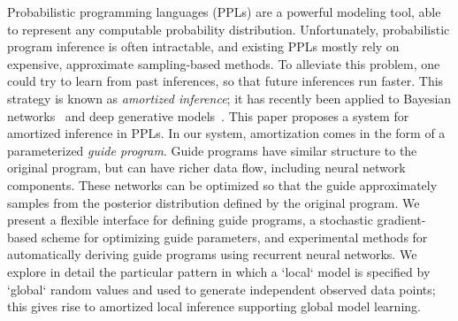 
Probabilistic programming languages (PPLs) are a powerful modeling tool, able to represent any computable probability distribution.
%
Unfortunately, probabilistic program inference is often intractable, and existing PPLs mostly rely on expensive, approximate sampling-based methods.
%
To alleviate this problem, one could try to learn from past inferences, so that future inferences run faster.
This strategy is known as \emph{amortized inference}; it has recently been applied to Bayesian networks~\cite{StochasticInverses,NeuralStochasticInverses} and deep generative models~\cite{NVIL,AEVB,DLGM}.
%
This paper proposes a system for amortized inference in PPLs.
In our system, amortization comes in the form of a parameterized \emph{guide program}.
Guide programs have similar structure to the original program, but can have richer data flow, including neural network components.
These networks can be optimized so that the guide approximately samples from the posterior distribution defined by the original program.
We present a flexible interface for defining guide programs, a stochastic gradient-based scheme for optimizing guide parameters, and experimental methods for automatically deriving guide programs using recurrent neural networks.
We explore in detail the particular pattern in which a `local` model is specified by `global` random values and used to generate independent observed data points; this gives rise to amortized local inference supporting global model learning.
%

